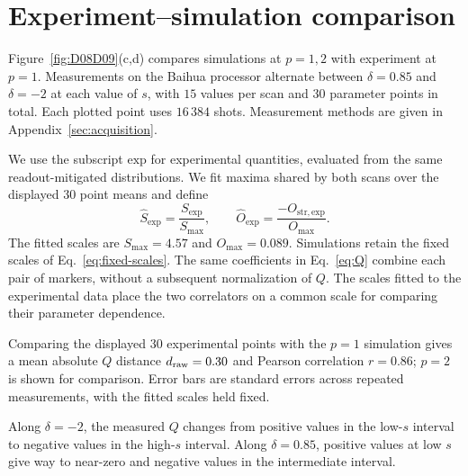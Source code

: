 \section{Experiment--simulation comparison}
\label{sec:comparison}

Figure~\ref{fig:D08D09}(c,d) compares simulations at $p=1,2$ with experiment at $p=1$.
Measurements on the Baihua processor alternate between $\delta=0.85$ and $\delta=-2$ at each value of $s$, with $15$ values per scan and $30$ parameter points in total.
Each plotted point uses $16\,384$ shots.
Measurement methods are given in Appendix~\ref{sec:acquisition}.

We use the subscript $\mathrm{exp}$ for experimental quantities, evaluated from the same readout-mitigated distributions.
We fit maxima shared by both scans over the displayed $30$ point means and define
\begin{equation}
\hat S_{\mathrm{exp}}=\frac{S_{\mathrm{exp}}}{S_{\max}},\qquad
\hat O_{\mathrm{exp}}=\frac{-O_{\mathrm{str},\mathrm{exp}}}{O_{\max}}.
\label{eq:hardware-scales}
\end{equation}
The fitted scales are $S_{\max}=4.57$ and $O_{\max}=0.089$.
Simulations retain the fixed scales of Eq.~\eqref{eq:fixed-scales}.
The same coefficients in Eq.~\eqref{eq:Q} combine each pair of markers, without a subsequent normalization of $Q$.
The scales fitted to the experimental data place the two correlators on a common scale for comparing their parameter dependence.

Comparing the displayed $30$ experimental points with the $p=1$ simulation gives a mean absolute $Q$ distance $d_{\rm raw}=0.30$ and Pearson correlation $r=0.86$; $p=2$ is shown for comparison.
Error bars are standard errors across repeated measurements, with the fitted scales held fixed.

Along $\delta=-2$, the measured $Q$ changes from positive values in the low-$s$ interval to negative values in the high-$s$ interval.
Along $\delta=0.85$, positive values at low $s$ give way to near-zero and negative values in the intermediate interval.
